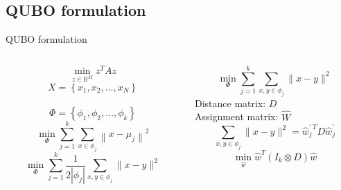 
\subsection{QUBO formulation}
	\begin{frame}{QUBO formulation}
		\begin{columns}
			\begin{column}{0.5\textwidth}
				$$\min _{z \in \mathbb{B}^{M}} z^{T} A z$$
				\pause
				$$X=\left\{x_{1}, x_{2}, \ldots, x_{N}\right\}$$\\$$\Phi=\left\{\phi_{1}, \phi_{2}, \ldots, \phi_{k}\right\}$$
				\pause
				$$\min _{\Phi} \sum_{j=1}^{k} \sum_{x \in \phi_{j}}\left\|x-\mu_{j}\right\|^{2}$$
				\pause
				$$\min _{\Phi} \sum_{j=1}^{k} \frac{1}{2\left|\phi_{j}\right|} \sum_{x, y \in \phi_{j}}\|x-y\|^{2}$$
				\pause

			\end{column}
			\begin{column}{0.5\textwidth}  
				$$\min _{\Phi} \sum_{j=1}^{k} \sum_{x, y \in \phi_{j}}\|x-y\|^{2}$$
				\pause
				Distance matrix: $D$ \\Assignment matrix: $\hat W$
				\pause
				$$\sum_{x, y \in \phi_{j}}\|x-y\|^{2}=\hat{w}^{\prime \: T}_{j} D \hat{w}_{j}^{\prime}$$
				\pause
				$$\min _{\hat{w}} \hat{w}^{T}\left(I_{k} \otimes D\right) \hat{w}$$
			\end{column}
		\end{columns}
	\end{frame}

